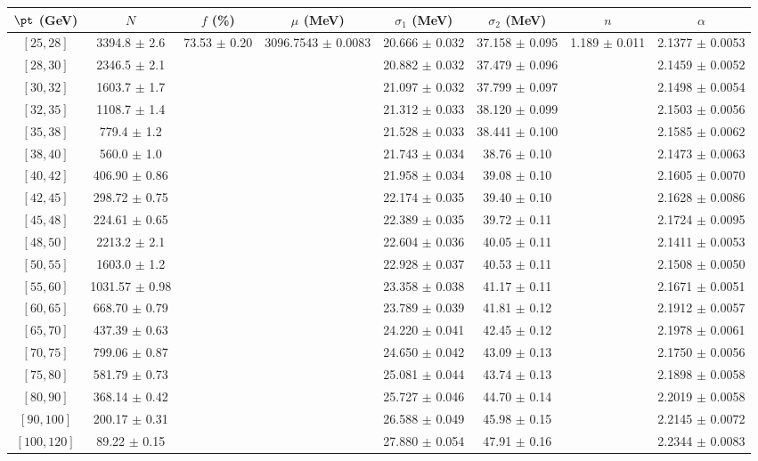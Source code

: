 \begin{tabular}{c||c|c|c|c|c|c|c}
$\pt$ (GeV) & $N$ & $f$ (\%) & $\mu$ (MeV) & $\sigma_1$ (MeV) & $\sigma_2$ (MeV) & $n$ & $\alpha$ \\
\hline
$[25, 28]$ & 3394.8 $\pm$ 2.6 & \multirow{19}{*}{73.53 $\pm$ 0.20} & \multirow{19}{*}{3096.7543 $\pm$ 0.0083} & 20.666 $\pm$ 0.032 & 37.158 $\pm$ 0.095 & \multirow{19}{*}{1.189 $\pm$ 0.011} & 2.1377 $\pm$ 0.0053\\
$[28, 30]$ & 2346.5 $\pm$ 2.1 &  &  & 20.882 $\pm$ 0.032 & 37.479 $\pm$ 0.096 &  & 2.1459 $\pm$ 0.0052\\
$[30, 32]$ & 1603.7 $\pm$ 1.7 &  &  & 21.097 $\pm$ 0.032 & 37.799 $\pm$ 0.097 &  & 2.1498 $\pm$ 0.0054\\
$[32, 35]$ & 1108.7 $\pm$ 1.4 &  &  & 21.312 $\pm$ 0.033 & 38.120 $\pm$ 0.099 &  & 2.1503 $\pm$ 0.0056\\
$[35, 38]$ & 779.4 $\pm$ 1.2 &  &  & 21.528 $\pm$ 0.033 & 38.441 $\pm$ 0.100 &  & 2.1585 $\pm$ 0.0062\\
$[38, 40]$ & 560.0 $\pm$ 1.0 &  &  & 21.743 $\pm$ 0.034 & 38.76 $\pm$ 0.10 &  & 2.1473 $\pm$ 0.0063\\
$[40, 42]$ & 406.90 $\pm$ 0.86 &  &  & 21.958 $\pm$ 0.034 & 39.08 $\pm$ 0.10 &  & 2.1605 $\pm$ 0.0070\\
$[42, 45]$ & 298.72 $\pm$ 0.75 &  &  & 22.174 $\pm$ 0.035 & 39.40 $\pm$ 0.10 &  & 2.1628 $\pm$ 0.0086\\
$[45, 48]$ & 224.61 $\pm$ 0.65 &  &  & 22.389 $\pm$ 0.035 & 39.72 $\pm$ 0.11 &  & 2.1724 $\pm$ 0.0095\\
$[48, 50]$ & 2213.2 $\pm$ 2.1 &  &  & 22.604 $\pm$ 0.036 & 40.05 $\pm$ 0.11 &  & 2.1411 $\pm$ 0.0053\\
$[50, 55]$ & 1603.0 $\pm$ 1.2 &  &  & 22.928 $\pm$ 0.037 & 40.53 $\pm$ 0.11 &  & 2.1508 $\pm$ 0.0050\\
$[55, 60]$ & 1031.57 $\pm$ 0.98 &  &  & 23.358 $\pm$ 0.038 & 41.17 $\pm$ 0.11 &  & 2.1671 $\pm$ 0.0051\\
$[60, 65]$ & 668.70 $\pm$ 0.79 &  &  & 23.789 $\pm$ 0.039 & 41.81 $\pm$ 0.12 &  & 2.1912 $\pm$ 0.0057\\
$[65, 70]$ & 437.39 $\pm$ 0.63 &  &  & 24.220 $\pm$ 0.041 & 42.45 $\pm$ 0.12 &  & 2.1978 $\pm$ 0.0061\\
$[70, 75]$ & 799.06 $\pm$ 0.87 &  &  & 24.650 $\pm$ 0.042 & 43.09 $\pm$ 0.13 &  & 2.1750 $\pm$ 0.0056\\
$[75, 80]$ & 581.79 $\pm$ 0.73 &  &  & 25.081 $\pm$ 0.044 & 43.74 $\pm$ 0.13 &  & 2.1898 $\pm$ 0.0058\\
$[80, 90]$ & 368.14 $\pm$ 0.42 &  &  & 25.727 $\pm$ 0.046 & 44.70 $\pm$ 0.14 &  & 2.2019 $\pm$ 0.0058\\
$[90, 100]$ & 200.17 $\pm$ 0.31 &  &  & 26.588 $\pm$ 0.049 & 45.98 $\pm$ 0.15 &  & 2.2145 $\pm$ 0.0072\\
$[100, 120]$ & 89.22 $\pm$ 0.15 &  &  & 27.880 $\pm$ 0.054 & 47.91 $\pm$ 0.16 &  & 2.2344 $\pm$ 0.0083\\
\end{tabular}
